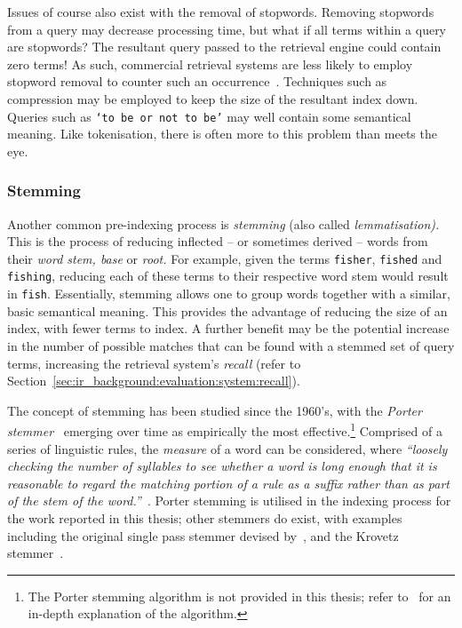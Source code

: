 Issues of course also exist with the removal of stopwords. Removing stopwords from a query may decrease processing time, but what if all terms within a query are stopwords? The resultant query passed to the retrieval engine could contain zero terms! As such, commercial retrieval systems are less likely to employ stopword removal to counter such an occurrence~\citep{manning2008ir, dolamic2010stopword}. Techniques such as compression may be employed to keep the size of the resultant index down. Queries such as \texttt{`to be or not to be'} may well contain some semantical meaning. Like tokenisation, there is often more to this problem than meets the eye.

\subsubsection{Stemming}
Another common pre-indexing process is \emph{stemming} (also called \emph{lemmatisation).} This is the process of reducing inflected -- or sometimes derived -- words from their \emph{word stem, base} or \emph{root.} For example, given the terms \texttt{fisher}, \texttt{fished} and \texttt{fishing}, reducing each of these terms to their respective word stem would result in \texttt{fish}. Essentially, stemming allows one to group words together with a similar, basic semantical meaning. This provides the advantage of reducing the size of an index, with fewer terms to index. A further benefit may be the potential increase in the number of possible matches that can be found with a stemmed set of query terms, increasing the retrieval system's \emph{recall} (refer to Section~\ref{sec:ir_background:evaluation:system:recall}).

The concept of stemming has been studied since the 1960's, with the \emph{Porter stemmer}~\citep{porter1980algorithm} emerging over time as empirically the most effective.\footnote{The Porter stemming algorithm is not provided in this thesis; refer to~\cite{porter1980algorithm} for an in-depth explanation of the algorithm.} Comprised of a series of linguistic rules, the \emph{measure} of a word can be considered, where \emph{``loosely checking the number of syllables to see whether a word is long enough that it is reasonable to regard the matching portion of a rule as a suffix rather than as part of the stem of the word.''}~\citep{manning2008ir}. Porter stemming is utilised in the indexing process for the work reported in this thesis; other stemmers do exist, with examples including the original single pass stemmer devised by~\cite{lovins1968development}, and the Krovetz stemmer~\citep{krovetz1993stemming}.

